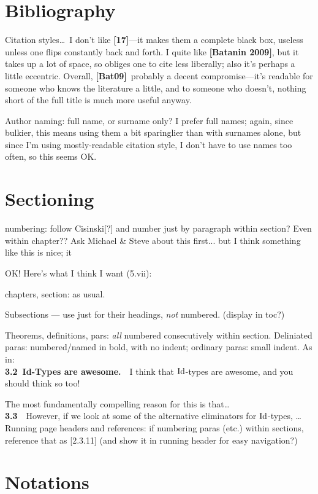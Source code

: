 \documentclass{amsart}
\begin{document}
\section{Bibliography}

Citation styles\ldots\ I don't like \textbf{[17]}---it makes them a complete black box, useless unless one flips constantly back and forth.  I quite like \textbf{[Batanin 2009]}, but it takes up a lot of space, so obliges one to cite less liberally; also it's perhaps a little eccentric.  Overall, \textbf{[Bat09]}\ probably a decent compromise---it's readable for someone who knows the literature a little, and to someone who doesn't, nothing short of the full title is much more useful anyway.

Author naming: full name, or surname only?  I prefer full names; again, since bulkier, this means using them a bit sparinglier than with surnames alone, but since I'm using mostly-readable citation style, I don't have to use names too often, so this seems OK.

\section{Sectioning}  numbering: follow Cisinski[?] and number just by paragraph within section?  Even within chapter??  Ask Michael \& Steve about this first...  but I think something like this is nice; it 

OK!  Here's what I think I want (5.vii):

chapters, section: as usual.

Subsections --- use just for their headings, \emph{not} numbered.  (display in toc?)

Theorems, definitions, pars: \emph{all} numbered consecutively within section.
Deliniated paras: numbered/named in bold, with no indent; ordinary paras: small indent.  As in: \\

\noindent \textbf{3.2\ Id-Types are awesome.}\ \ I think that $\mathrm{Id}$-types are awesome, and you should think so too!

The most fundamentally compelling reason for this is that\ldots \\
  
\noindent \textbf{3.3}\ \ However, if we look at some of the alternative eliminators for $\mathrm{Id}$-types, \ldots \\

Running page headers and references: if numbering paras (etc.) within sections,  reference that as [2.3.11] (and show it in running header for easy navigation?)

\section{Notations}
\end{document}
